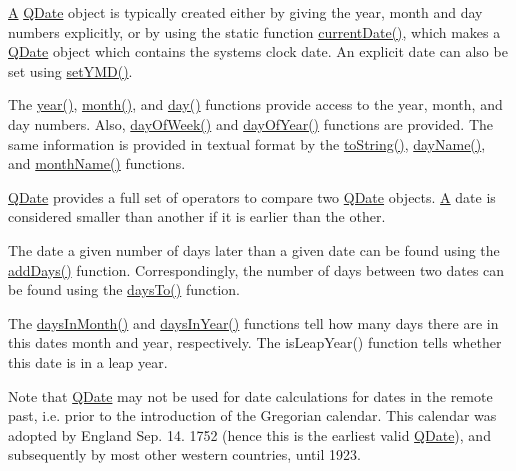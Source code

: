 \mbox{\hyperlink{class_a}{A}} \mbox{\hyperlink{class_q_date}{Q\+Date}} object is typically created either by giving the year, month and day numbers explicitly, or by using the static function \mbox{\hyperlink{class_q_date_a7112e1452f46e40cf349f2e769887e1c}{current\+Date()}}, which makes a \mbox{\hyperlink{class_q_date}{Q\+Date}} object which contains the system\textquotesingle{}s clock date. An explicit date can also be set using \mbox{\hyperlink{class_q_date_ae25b0507f1694495d64ff068b0baa50e}{set\+Y\+M\+D()}}.

The \mbox{\hyperlink{class_q_date_a7ad4fc16e91f089391a4ea9710076839}{year()}}, \mbox{\hyperlink{class_q_date_a42aa3a5238c1dd81848e0bf690b3dce5}{month()}}, and \mbox{\hyperlink{class_q_date_a4da6cc4ed155922c376d61102ffcb372}{day()}} functions provide access to the year, month, and day numbers. Also, \mbox{\hyperlink{class_q_date_ae69fd6a7673886fc31ce220ef2137d39}{day\+Of\+Week()}} and \mbox{\hyperlink{class_q_date_ac62a08183c6fdd45f2a96e8f91b0f7a2}{day\+Of\+Year()}} functions are provided. The same information is provided in textual format by the \mbox{\hyperlink{class_q_date_aebc53b28c073570214cfc6f1376cbcd5}{to\+String()}}, \mbox{\hyperlink{class_q_date_a08320176a833c05ff718155da1177381}{day\+Name()}}, and \mbox{\hyperlink{class_q_date_afa5fcbf8ec6629175873dd50cbc3da4c}{month\+Name()}} functions.

\mbox{\hyperlink{class_q_date}{Q\+Date}} provides a full set of operators to compare two \mbox{\hyperlink{class_q_date}{Q\+Date}} objects. \mbox{\hyperlink{class_a}{A}} date is considered smaller than another if it is earlier than the other.

The date a given number of days later than a given date can be found using the \mbox{\hyperlink{class_q_date_aea0944d5825cb73f4bdad70577ba9a31}{add\+Days()}} function. Correspondingly, the number of days between two dates can be found using the \mbox{\hyperlink{class_q_date_a4089a34058a747a78a1f5f3b3ea4ad0d}{days\+To()}} function.

The \mbox{\hyperlink{class_q_date_aa2321fc7b1bd778bd37a94e3c155e621}{days\+In\+Month()}} and \mbox{\hyperlink{class_q_date_ac3ae4b9dc8054be16c1524d20a8d8849}{days\+In\+Year()}} functions tell how many days there are in this date\textquotesingle{}s month and year, respectively. The is\+Leap\+Year() function tells whether this date is in a leap year.

Note that \mbox{\hyperlink{class_q_date}{Q\+Date}} may not be used for date calculations for dates in the remote past, i.\+e. prior to the introduction of the Gregorian calendar. This calendar was adopted by England Sep. 14. 1752 (hence this is the earliest valid \mbox{\hyperlink{class_q_date}{Q\+Date}}), and subsequently by most other western countries, until 1923.

